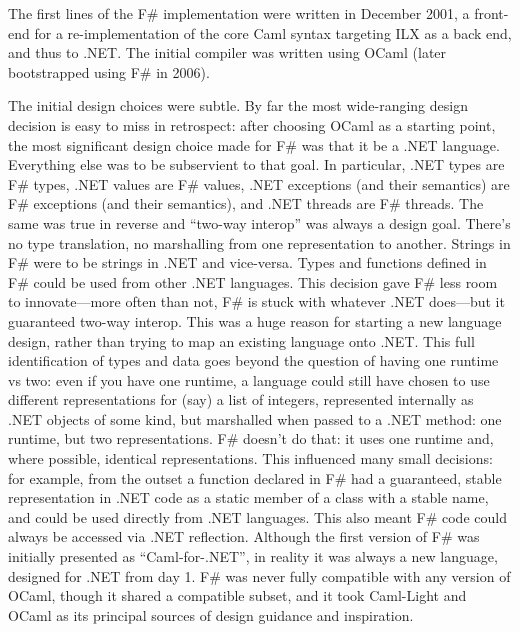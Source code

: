 \documentclass[acmsmall,screen]{acmart}
\begin{document}
The first lines of the F\# implementation were written in December 2001, a front-end for a re-implementation of the core Caml syntax targeting ILX as a back end, and thus to .NET. The initial compiler was written using OCaml (later bootstrapped using F\# in 2006). 

The initial design choices were subtle.  By far the most wide-ranging design decision is easy to miss in retrospect: after choosing OCaml as a
starting point, the most significant design choice made for F\# was that it be a .NET language.  Everything else was to be subservient to
that goal.  In particular, .NET types are F\# types, .NET values are F\# values, .NET exceptions (and their semantics) are F\# exceptions
(and their semantics), and .NET threads are F\# threads.  The same was true in reverse and “two-way interop” was always a design goal.
There’s no type translation, no marshalling from one representation to another. Strings in F\# were to be strings in .NET and vice-versa.
Types and functions defined in F\# could be used from other .NET languages. This decision gave F\# less room to innovate---more often
than not, F\# is stuck with whatever .NET does---but it guaranteed two-way interop.  This was a huge reason for starting a new language
design, rather than trying to map an existing language onto .NET.  This full identification of types and data goes beyond the question of
having one runtime vs two: even if you have one runtime, a language could still have chosen to use different representations for (say) a
list of integers, represented internally as .NET objects of some kind, but marshalled when passed to a .NET method: one runtime, but two
representations. F\# doesn’t do that: it uses one runtime and, where possible, identical representations. This influenced many small decisions: for
example, from the outset a function declared in F\# had a guaranteed, stable representation in .NET code as a static member of a class with a
stable name, and could be used directly from .NET languages.  This also meant F\# code could always be accessed via .NET reflection.  Although
the first version of F\# was initially presented as “Caml-for-.NET”, in reality it was always a new language, designed for .NET from day 1. F\# was never
fully compatible with any version of OCaml, though it shared a compatible subset, and it took Caml-Light and OCaml as its principal sources of design guidance and inspiration.  
\end{document}
